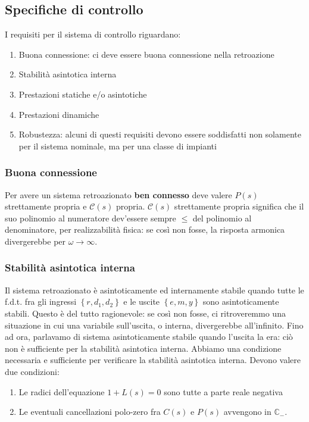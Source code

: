 \documentclass[11pt]{article}
\begin{document}
\subsection{Specifiche di controllo}
I requisiti per il sistema di controllo riguardano:
\begin{enumerate}
    \item Buona connessione: ci deve essere buona connessione nella retroazione
    \item Stabilità asintotica interna
    \item Prestazioni statiche e/o asintotiche
    \item Prestazioni dinamiche
    \item Robustezza: alcuni di questi requisiti devono essere soddisfatti non solamente per il sistema nominale, ma per una classe di impianti
\end{enumerate}
\subsubsection{Buona connessione}
Per avere un sistema retroazionato \textbf{ben connesso} deve valere $P(s)$ strettamente propria e $\mathcal{C}(s)$ propria. $\mathcal{C}(s)$ strettamente propria significa che il suo polinomio al numeratore dev'essere sempre $\le$ del polinomio al denominatore, per realizzabilità fisica: se così non fosse, la risposta armonica divergerebbe per $\omega\rightarrow\infty$.
\subsubsection{Stabilità asintotica interna}
Il sistema retroazionato è asintoticamente ed internamente stabile quando tutte le f.d.t. fra gli ingressi $\left\{r,d_1,d_2\right\}$ e le uscite $\left\{e,m,y\right\}$ sono asintoticamente stabili. Questo è del tutto ragionevole: se così non fosse, ci ritroveremmo una situazione in cui una variabile sull'uscita, o interna, divergerebbe all'infinito.
Fino ad ora, parlavamo di sistema asintoticamente stabile quando l'uscita la era: ciò non è sufficiente per la stabilità asintotica interna. Abbiamo una condizione necessaria e sufficiente per verificare la stabilità asintotica interna. Devono valere due condizioni:
\begin{enumerate}
    \item Le radici dell'equazione $1+L(s)=0$ sono tutte a parte reale negativa
    \item Le eventuali cancellazioni polo-zero fra $C(s)$ e $P(s)$ avvengono in $\mathbb{C}_-$.
\end{enumerate}
\end{document}
